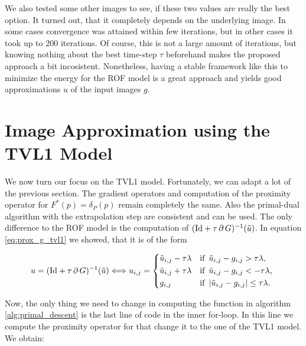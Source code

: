         We also tested some other images to see, if these two values are really the best option. It turned out, that it completely depends on the underlying image. In some cases convergence was attained within few iterations, but in other cases it took up to 200 iterations. Of course, this is not a large amount of iterations, but knowing nothing about the best time-step $\tau$ beforehand makes the proposed approach a bit incosistent. Nonetheless, having a stable framework like this to minimize the energy for the ROF model is a great approach and yields good approximations $u$ of the input images $g$.

\section{Image Approximation using the TVL1 Model} %
\label{sec:image_approximation_using_the_tvl1_model}

    We now turn our focus on the TVL1 model. Fortunately, we can adapt a lot of the previous section. The gradient operators and computation of the proximity operator for $F^{\ast}(p) = \delta_{P}(p)$ remain completely the same. Also the primal-dual algorithm with the extrapolation step are consistent and can be used. The only difference to the ROF model is the computation of $(\textnormal{Id} + \tau\,\partial\,G)^{-1}(\tilde{u})$. In equation \ref{eq:prox_g_tvl1} we showed, that it is of the form

        $$
            u = (\textnormal{Id} + \tau\,\partial\,G)^{-1}(\tilde{u}) \Longleftrightarrow u_{i, j} = 
                \begin{dcases*}
                    \tilde{u}_{i,j} - \tau\lambda & \textnormal{if\, $\tilde{u}_{i,j} - g_{i,j} > \tau\lambda$,} \\
                    \tilde{u}_{i,j} + \tau\lambda & \textnormal{if\, $\tilde{u}_{i,j} - g_{i,j} < - \tau\lambda$,} \\
                    g_{i, j} & \textnormal{if\, $|\tilde{u}_{i,j} - g_{i,j}| \le \tau\lambda$}.
                \end{dcases*}
        $$

    Now, the only thing we need to change in computing the function in algorithm \ref{alg:primal_descent} is the last line of code in the inner for-loop. In this line we compute the proximity operator for that change it to the one of the TVL1 model. We obtain:

